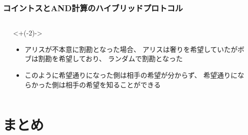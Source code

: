 \begin{frame}
  \frametitle{コイントスとAND計算のハイブリッドプロトコル}

  \begin{columns}
    \begin{column}{0.6\textwidth}

    \end{column}
    \begin{column}{0.4\textwidth}
      \uncover<+(-2)->{
        \begin{itemize}
          \item アリスが不本意に割勘となった場合、
          アリスは奢りを希望していたがボブは割勘を希望しており、
          ランダムで割勘となった

          \item<2-> このように希望通りになった側は相手の希望が分からず、
          希望通りにならかった側は相手の希望を知ることができる
        \end{itemize}
      }
    \end{column}
  \end{columns}
\end{frame}

\section{まとめ}

